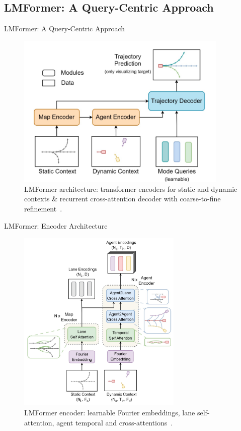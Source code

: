 \documentclass[10pt,aspectratio=169]{beamer}
\begin{document}
\subsection{LMFormer: A Query-Centric Approach}

\begin{frame}{LMFormer: A Query-Centric Approach}
    \begin{figure}
        \centering
        \includegraphics[width=0.9\textwidth]{docs/figures/lmformer_arch.png}
        \caption{LMFormer architecture: transformer encoders for static and dynamic contexts \& recurrent cross-attention decoder with coarse-to-fine refinement~\cite{lmformerYadav2025}.}
    \end{figure}
\end{frame}

\begin{frame}{LMFormer: Encoder Architecture}
    \begin{figure}
        \centering
        \includegraphics[width=0.7\textwidth]{docs/figures/lmformer_arch_encorder.png}
        \caption{LMFormer encoder: learnable Fourier embeddings, lane self-attention, agent temporal and cross-attentions~\cite{lmformerYadav2025}.}
    \end{figure}
\end{frame}
\end{document}
